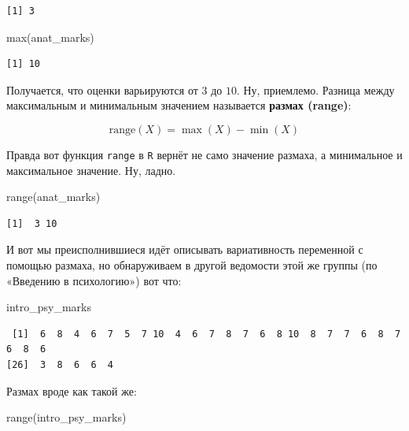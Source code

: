 \documentclass[
  letterpaper,
]{scrbook}
\newenvironment{Shaded}{}{}
\newcommand{\FunctionTok}[1]{\textcolor[rgb]{0.44,0.26,0.76}{#1}}
\newcommand{\NormalTok}[1]{\textcolor[rgb]{0.14,0.16,0.18}{#1}}
\theoremstyle{definition}
\theoremstyle{remark}
\begin{document}
\begin{verbatim}
[1] 3
\end{verbatim}

\begin{Shaded}
\begin{Highlighting}[]
\FunctionTok{max}\NormalTok{(anat\_marks)}
\end{Highlighting}
\end{Shaded}

\begin{verbatim}
[1] 10
\end{verbatim}

Получается, что оценки варьируются от \(3\) до \(10\). Ну, приемлемо.
Разница между максимальным и минимальным значением называется
\textbf{размах (range)}:

\[
\mathrm{range}(X) = \max(X) - \min(X)
\]

Правда вот функция \texttt{range} в \texttt{R} вернёт не само значение
размаха, а минимальное и максимальное значение. Ну, ладно.

\begin{Shaded}
\begin{Highlighting}[]
\FunctionTok{range}\NormalTok{(anat\_marks)}
\end{Highlighting}
\end{Shaded}

\begin{verbatim}
[1]  3 10
\end{verbatim}

И вот мы преисполнившиеся идёт описывать вариативность переменной с
помощью размаха, но обнаруживаем в другой ведомости этой же группы (по
«Введению в психологию») вот что:

\begin{Shaded}
\begin{Highlighting}[]
\NormalTok{intro\_psy\_marks}
\end{Highlighting}
\end{Shaded}

\begin{verbatim}
 [1]  6  8  4  6  7  5  7 10  4  6  7  8  7  6  8 10  8  7  7  6  8  7  6  8  6
[26]  3  8  6  6  4
\end{verbatim}

Размах вроде как такой же:

\begin{Shaded}
\begin{Highlighting}[]
\FunctionTok{range}\NormalTok{(intro\_psy\_marks)}
\end{Highlighting}
\end{Shaded}
\end{document}
